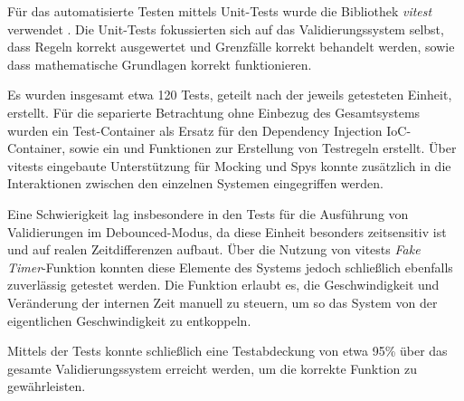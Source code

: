 Für das automatisierte Testen mittels Unit-Tests wurde die Bibliothek \textit{vitest} verwendet \parencite{fuVitest2025}. Die Unit-Tests fokussierten sich auf das Validierungssystem selbst, dass Regeln korrekt ausgewertet und Grenzfälle korrekt behandelt werden, sowie dass mathematische Grundlagen korrekt funktionieren.

Es wurden insgesamt etwa 120 Tests, geteilt nach der jeweils getesteten Einheit, erstellt. Für die separierte Betrachtung ohne Einbezug des Gesamtsystems wurden ein Test-Container als Ersatz für den Dependency Injection IoC-Container, sowie ein  und Funktionen zur Erstellung von Testregeln erstellt. Über vitests eingebaute Unterstützung für Mocking und Spys konnte zusätzlich in die Interaktionen zwischen den einzelnen Systemen eingegriffen werden.

Eine Schwierigkeit lag insbesondere in den Tests für die Ausführung von Validierungen im Debounced-Modus, da diese Einheit besonders zeitsensitiv ist und auf realen Zeitdifferenzen aufbaut. Über die Nutzung von vitests \textit{Fake Timer}-Funktion konnten diese Elemente des Systems jedoch schließlich ebenfalls zuverlässig getestet werden. Die Funktion erlaubt es, die Geschwindigkeit und Veränderung der internen Zeit manuell zu steuern, um so das System von der eigentlichen Geschwindigkeit zu entkoppeln.

Mittels der Tests konnte schließlich eine Testabdeckung von etwa 95\% über das gesamte Validierungssystem erreicht werden, um die korrekte Funktion zu gewährleisten.
